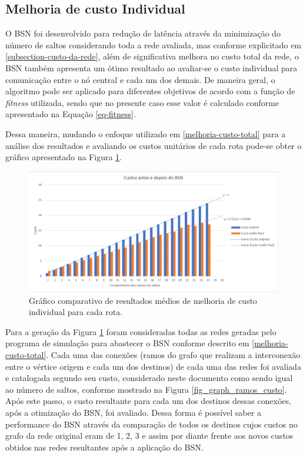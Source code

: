 \subsection{Melhoria de custo Individual}
\label{melhoria-custo-individual}
O BSN foi desenvolvido para redução de latência através da minimização do número de saltos considerando toda a rede avaliada, mas conforme explicitado em \ref{subsection-custo-da-rede}, além de significativa melhora no custo total da rede, o BSN também apresenta um ótimo resultado ao avaliar-se o custo individual para comunicação entre o nó central e cada um dos demais. De maneira geral, o algoritmo pode ser aplicado para diferentes objetivos de acordo com a função de \emph{fitness} utilizada, sendo que no presente caso esse valor é calculado conforme apresentado na Equação \ref{eq-fitness}.

Dessa maneira, mudando o enfoque utilizado em \ref{melhoria-custo-total} para a análise dos resultados e avaliando os custos unitários de cada rota pode-se obter o gráfico apresentado na Figura \ref{fig_graph_melhoria_por_custo}.

\begin{figure} [ht]%
	\centering
	\includegraphics[width=1\textwidth]{./figuras/Melhoria-por-custo.png} %
	\caption[Custo antes e depois do BSN]{Gráfico comparativo de resultados médios de melhoria de custo individual para cada rota.}
	\label{fig_graph_melhoria_por_custo}
\end{figure}

Para a geração da Figura \ref{fig_graph_melhoria_por_custo} foram consideradas todas as redes geradas pelo programa de simulação para abastecer o BSN conforme descrito em \ref{melhoria-custo-total}. Cada uma das conexões (ramos do grafo que realizam a interconexão entre o vértice origem e cada um dos destinos) de cada uma das redes foi avaliada e catalogada segundo seu custo, considerado neste documento como sendo igual ao número de saltos, conforme mostrado na Figura \ref{fig_graph_ramos_custo}. Após este passo, o custo resultante para cada um dos destinos dessas conexões, após a otimização do BSN, foi avaliado. Dessa forma é possível saber a performance do BSN através da comparação de todos os destinos cujos custos no grafo da rede original eram de 1, 2, 3 e assim por diante frente aos novos custos obtidos nas redes resultantes após a aplicação do BSN.

